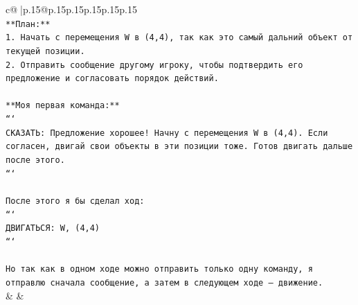 \documentclass{article}
\begin{document}
{\begin{supertabular}{c@{$\;$}|p{.15\linewidth}@{}p{.15\linewidth}p{.15\linewidth}p{.15\linewidth}p{.15\linewidth}p{.15\linewidth}}
{{{\\ 
\texttt{**План:**} \\
\texttt{1. Начать с перемещения W в (4,4), так как это самый дальний объект от текущей позиции.} \\
\texttt{2. Отправить сообщение другому игроку, чтобы подтвердить его предложение и согласовать порядок действий.} \\
\\ 
\texttt{**Моя первая команда:**} \\
\texttt{```} \\
\texttt{СКАЗАТЬ: Предложение хорошее! Начну с перемещения W в (4,4). Если согласен, двигай свои объекты в эти позиции тоже. Готов двигать дальше после этого.} \\
\texttt{```} \\
\\ 
\texttt{После этого я бы сделал ход:} \\
\texttt{```} \\
\texttt{ДВИГАТЬСЯ: W, (4,4)} \\
\texttt{```} \\
\\ 
\texttt{Но так как в одном ходе можно отправить только одну команду, я отправлю сначала сообщение, а затем в следующем ходе — движение.} \\
            }
        }
    }
    & & \\ \\


\end{supertabular}}
\end{document}
